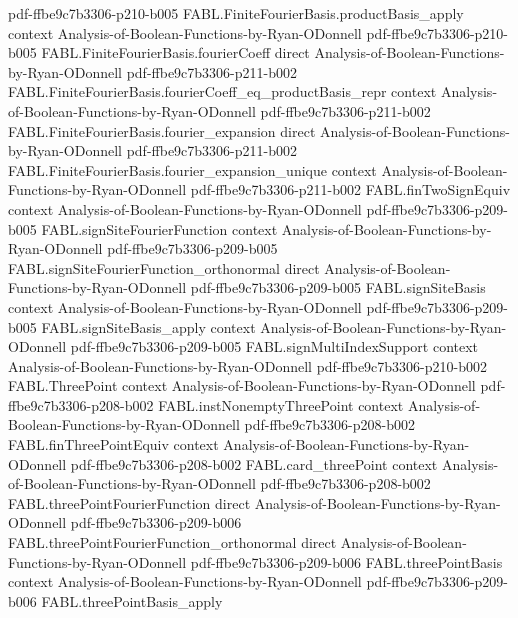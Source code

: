 \begin{theorem}
  {pdf-ffbe9c7b3306-p210-b005}
\proofstep
  {FABL.FiniteFourierBasis.productBasis_apply}
  {context}
  {Analysis-of-Boolean-Functions-by-Ryan-ODonnell}
  {pdf-ffbe9c7b3306-p210-b005}
\proofstep
  {FABL.FiniteFourierBasis.fourierCoeff}
  {direct}
  {Analysis-of-Boolean-Functions-by-Ryan-ODonnell}
  {pdf-ffbe9c7b3306-p211-b002}
\proofstep
  {FABL.FiniteFourierBasis.fourierCoeff_eq_productBasis_repr}
  {context}
  {Analysis-of-Boolean-Functions-by-Ryan-ODonnell}
  {pdf-ffbe9c7b3306-p211-b002}
\proofstep
  {FABL.FiniteFourierBasis.fourier_expansion}
  {direct}
  {Analysis-of-Boolean-Functions-by-Ryan-ODonnell}
  {pdf-ffbe9c7b3306-p211-b002}
\proofstep
  {FABL.FiniteFourierBasis.fourier_expansion_unique}
  {context}
  {Analysis-of-Boolean-Functions-by-Ryan-ODonnell}
  {pdf-ffbe9c7b3306-p211-b002}
\proofstep
  {FABL.finTwoSignEquiv}
  {context}
  {Analysis-of-Boolean-Functions-by-Ryan-ODonnell}
  {pdf-ffbe9c7b3306-p209-b005}
\proofstep
  {FABL.signSiteFourierFunction}
  {context}
  {Analysis-of-Boolean-Functions-by-Ryan-ODonnell}
  {pdf-ffbe9c7b3306-p209-b005}
\proofstep
  {FABL.signSiteFourierFunction_orthonormal}
  {direct}
  {Analysis-of-Boolean-Functions-by-Ryan-ODonnell}
  {pdf-ffbe9c7b3306-p209-b005}
\proofstep
  {FABL.signSiteBasis}
  {context}
  {Analysis-of-Boolean-Functions-by-Ryan-ODonnell}
  {pdf-ffbe9c7b3306-p209-b005}
\proofstep
  {FABL.signSiteBasis_apply}
  {context}
  {Analysis-of-Boolean-Functions-by-Ryan-ODonnell}
  {pdf-ffbe9c7b3306-p209-b005}
\proofstep
  {FABL.signMultiIndexSupport}
  {context}
  {Analysis-of-Boolean-Functions-by-Ryan-ODonnell}
  {pdf-ffbe9c7b3306-p210-b002}
\proofstep
  {FABL.ThreePoint}
  {context}
  {Analysis-of-Boolean-Functions-by-Ryan-ODonnell}
  {pdf-ffbe9c7b3306-p208-b002}
\proofstep
  {FABL.instNonemptyThreePoint}
  {context}
  {Analysis-of-Boolean-Functions-by-Ryan-ODonnell}
  {pdf-ffbe9c7b3306-p208-b002}
\proofstep
  {FABL.finThreePointEquiv}
  {context}
  {Analysis-of-Boolean-Functions-by-Ryan-ODonnell}
  {pdf-ffbe9c7b3306-p208-b002}
\proofstep
  {FABL.card_threePoint}
  {context}
  {Analysis-of-Boolean-Functions-by-Ryan-ODonnell}
  {pdf-ffbe9c7b3306-p208-b002}
\proofstep
  {FABL.threePointFourierFunction}
  {direct}
  {Analysis-of-Boolean-Functions-by-Ryan-ODonnell}
  {pdf-ffbe9c7b3306-p209-b006}
\proofstep
  {FABL.threePointFourierFunction_orthonormal}
  {direct}
  {Analysis-of-Boolean-Functions-by-Ryan-ODonnell}
  {pdf-ffbe9c7b3306-p209-b006}
\proofstep
  {FABL.threePointBasis}
  {context}
  {Analysis-of-Boolean-Functions-by-Ryan-ODonnell}
  {pdf-ffbe9c7b3306-p209-b006}
\proofstep
  {FABL.threePointBasis_apply}

\end{theorem}

